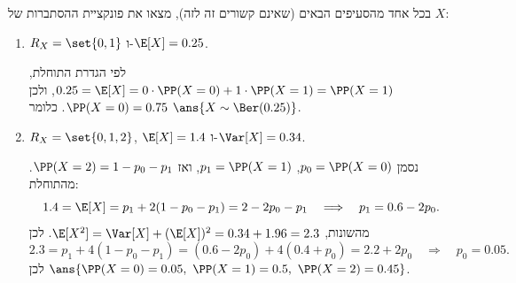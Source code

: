 בכל אחד מהסעיפים הבאים (שאינם קשורים זה לזה), מצאו את פונקציית ההסתברות של $X$:
\begin{enumerate}
\item $R_X=\set{0,1}$ ו-$\E[X]=0.25$.
\begin{solbox}
\unverified
לפי הגדרת התוחלת, $0.25=\E[X]=0\cdot\PP(X=0)+1\cdot\PP(X=1)=\PP(X=1)$, ולכן $\PP(X=0)=0.75$. כלומר $\ans{X\sim\Ber(0.25)}$.
\end{solbox}
\item $R_X=\set{0,1,2}$, $\E[X]=1.4$ ו-$\Var[X]=0.34$.
\begin{solbox}
\unverified
נסמן $p_0=\PP(X=0)$, $p_1=\PP(X=1)$, ואז $\PP(X=2)=1-p_0-p_1$. מהתוחלת:
\[
1.4=\E[X]=p_1+2(1-p_0-p_1)=2-2p_0-p_1\quad\Longrightarrow\quad p_1=0.6-2p_0.
\]
מהשונות, $\E[X^2]=\Var[X]+(\E[X])^2=0.34+1.96=2.3$. לכן
\[
2.3=p_1+4(1-p_0-p_1)=(0.6-2p_0)+4(0.4+p_0)=2.2+2p_0\quad\Longrightarrow\quad p_0=0.05.
\]
לכן $\ans{\PP(X=0)=0.05,\ \PP(X=1)=0.5,\ \PP(X=2)=0.45}$.
\end{solbox}
\end{enumerate}
